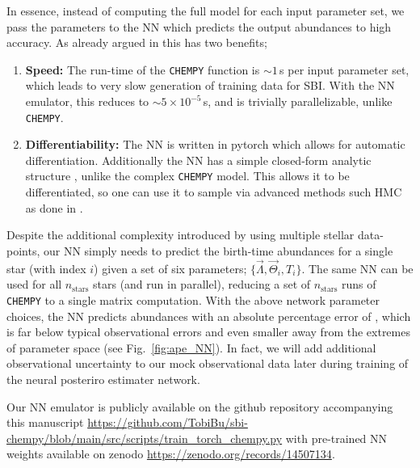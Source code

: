 \documentclass{aa}
\begin{document}
In essence, instead of computing the full model for each input parameter set, we pass the parameters to the NN which predicts the output abundances to high accuracy. As already argued in \cite{Philcox_2019} this has two benefits;
\begin{enumerate}
    \item \textbf{Speed:} The run-time of the \texttt{CHEMPY} function is $\sim1$\,s per input parameter set, which leads to very slow generation of training data for SBI. With the NN emulator, this reduces to $\sim5\times10^{-5}$\,s, and is trivially parallelizable, unlike \texttt{CHEMPY}.
    \item \textbf{Differentiability:} The NN is written in pytorch which allows for automatic differentiation. Additionally the NN has a simple closed-form analytic structure \citep[described in the appendix of][]{Philcox_2019}, unlike the complex \texttt{CHEMPY} model. This allows it to be differentiated, so one can use it to sample via advanced methods such HMC as done in \citep{Philcox_2019}.
\end{enumerate}

Despite the additional complexity introduced by using multiple stellar data-points, our NN simply needs to predict the birth-time abundances for a single star (with index $i$) given a set of six parameters; $\{\vec\Lambda,\vec\Theta_i,T_i\}$. The same NN can be used for all $n_\mathrm{stars}$ stars (and run in parallel), reducing a set of $n_\mathrm{stars}$ runs of \texttt{CHEMPY} to a single matrix computation. With the above network parameter choices, the NN predicts abundances with an absolute percentage error of , which is far below typical observational errors and even smaller away from the extremes of parameter space (see Fig.~\ref{fig:ape_NN}). In fact, we will add additional observational uncertainty to our mock observational data later during training of the neural posteriro estimater network. 

Our NN emulator is publicly available on the github repository accompanying this manuscript \href{https://github.com/TobiBu/sbi-chempy/blob/main/src/scripts/train_torch_chempy.py}{https://github.com/TobiBu/sbi-chempy/blob/main/src/scripts/train\_torch\_chempy.py} with pre-trained NN weights available on zenodo \href{https://zenodo.org/records/14507134}{https://zenodo.org/records/14507134}.
\end{document}
